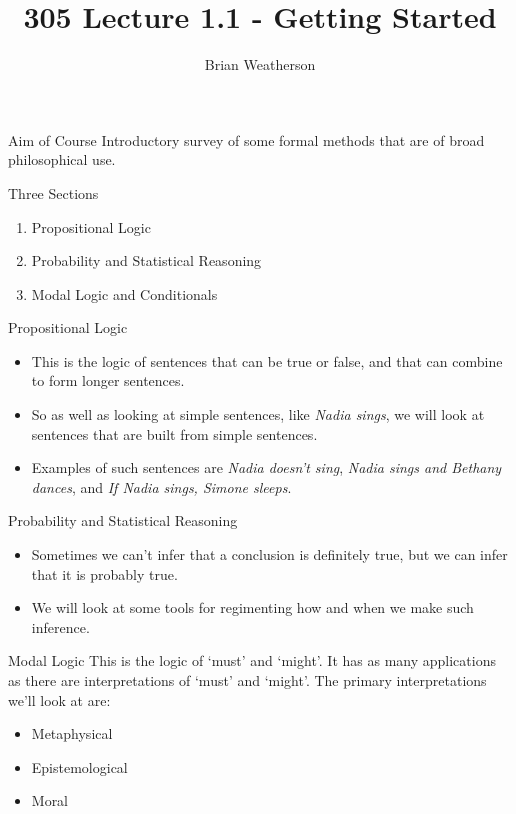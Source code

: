 \documentclass[
  ignorenonframetext,
]{beamer}
\title{305 Lecture 1.1 - Getting Started}
\author{Brian Weatherson}
\date{}
\providecommand{\tightlist}{%
  \setlength{\itemsep}{0pt}\setlength{\parskip}{0pt}}
\renewcommand{\,}{\text{, }}
\begin{document}
\frame{\titlepage}

\begin{frame}{Aim of Course}
\protect\hypertarget{aim-of-course}{}
Introductory survey of some formal methods that are of broad
philosophical use.
\end{frame}

\begin{frame}{Three Sections}
\protect\hypertarget{three-sections}{}
\begin{enumerate}[<+->]
\tightlist
\item
  Propositional Logic
\item
  Probability and Statistical Reasoning
\item
  Modal Logic and Conditionals
\end{enumerate}
\end{frame}

\begin{frame}{Propositional Logic}
\protect\hypertarget{propositional-logic}{}
\begin{itemize}
\tightlist
\item
  This is the logic of sentences that can be true or false, and that can
  combine to form longer sentences.
\item
  So as well as looking at simple sentences, like \emph{Nadia sings}, we
  will look at sentences that are built from simple sentences.
\item
  Examples of such sentences are \emph{Nadia doesn't sing}, \emph{Nadia
  sings and Bethany dances}, and \emph{If Nadia sings, Simone sleeps}.
\end{itemize}
\end{frame}

\begin{frame}{Probability and Statistical Reasoning}
\protect\hypertarget{probability-and-statistical-reasoning}{}
\begin{itemize}[<+->]
\tightlist
\item
  Sometimes we can't infer that a conclusion is definitely true, but we
  can infer that it is probably true.
\item
  We will look at some tools for regimenting how and when we make such
  inference.
\end{itemize}
\end{frame}

\begin{frame}{Modal Logic}
\protect\hypertarget{modal-logic}{}
This is the logic of `must' and `might'. It has as many applications as
there are interpretations of `must' and `might'. The primary
interpretations we'll look at are:

\begin{itemize}[<+->]
\tightlist
\item
  Metaphysical
\item
  Epistemological\\
\item
  Moral
\end{itemize}
\end{frame}
\end{document}
